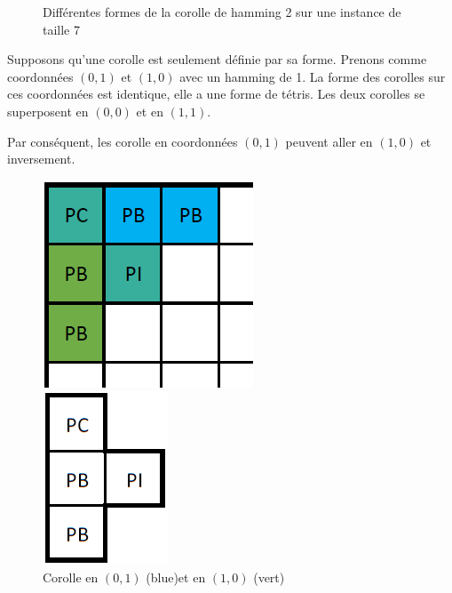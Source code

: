 \begin{figure}[H]
\begin{minipage}[t]{0.66\textwidth}
			\caption{Différentes formes de la corolle de hamming 2 sur une instance de taille 7}\label{fig:corolle_forme}
		\end{minipage}\hfill
	\end{figure}
	
	\begin{exmp}
		Supposons qu'une corolle est seulement définie par sa forme. Prenons comme coordonnées $(0,1)$ et $(1,0)$ avec un hamming de 1. La forme des corolles sur ces coordonnées est identique, elle a une forme de tétris. Les deux corolles se superposent en $(0,0)$ et en $(1,1)$.
		
		Par conséquent, les corolle en coordonnées $(0,1)$ peuvent aller en $(1,0)$ et inversement.
		
		\begin{figure}[H]
			\begin{minipage}{0.33\textwidth}
				\includegraphics[width=\linewidth]{images/corolle_tetris_bord.png}
				\caption{Corolle en $(0,1)$ (blue)et en $(1,0)$ (vert)}\label{fig:corolle_tetris_bord}
			\end{minipage}\hfill
			\begin{minipage}{0.33\textwidth}
				\begin{center}
					\includegraphics{images/corolle_tetris_1.png}

\end{center}
\end{minipage}
\end{figure}
\end{exmp}
